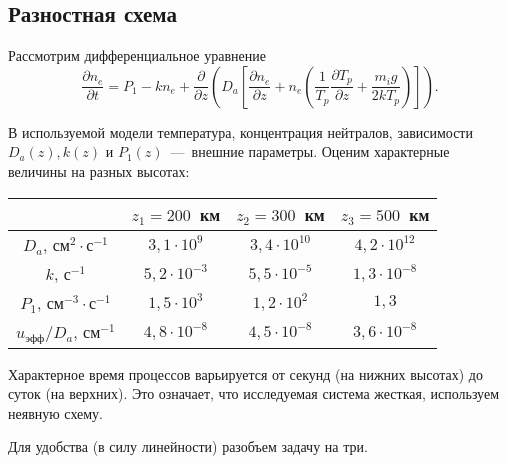 \documentclass[14pt, a4paper, fleqn, twoside]{extreport}
\theoremstyle{definiton}
\theoremstyle{definition}
\begin{document}
\subsection*{Разностная схема}

Рассмотрим дифференциальное уравнение $$\dfrac{\partial n_e}{\partial t}=P_1-kn_e + \dfrac{\partial}{\partial z}\left(D_a\left[\dfrac{\partial n_e}{\partial z}+n_e\left(\dfrac{1}{T_p}\dfrac{\partial T_p}{\partial z}+\dfrac{m_ig}{2kT_p}\right)\right]\right).$$

В используемой модели температура, концентрация нейтралов, зависимости $D_a(z), k(z)$ и $P_1(z)$~---~внешние параметры. Оценим характерные величины на разных высотах:

\smallskip

\begin{tabular}{|c|c|c|c|}
\hline
&$z_1=200$~км&$z_2=300$~км&$z_3=500$~км\\
\hline
$D_a$, см$^{2}\cdot$с$^{-1}$&$3{,}1\cdot 10^9$&$3{,}4\cdot 10^{10}$&$4{,}2\cdot 10^{12}$\\
\hline
$k$, с$^{-1}$&$5{,}2\cdot 10^{-3}$&$5{,}5\cdot 10^{-5}$&$1{,}3\cdot 10^{-8}$\\
\hline
$P_1$, см$^{-3}\cdot$с$^{-1}$&$1{,}5\cdot 10^3$&$1{,}2\cdot 10^{2}$&$1{,}3$\\
\hline
$u_\textrm{эфф}/D_a$, см$^{-1}$&$4{,}8\cdot 10^{-8}$&$4{,}5\cdot 10^{-8}$&$3{,}6\cdot 10^{-8}$\\
\hline
\end{tabular}

\medskip

Характерное время процессов варьируется от секунд (на нижних высотах) до суток (на верхних). Это означает, что исследуемая система жесткая, используем неявную схему.

\medskip

Для удобства (в силу линейности) разобъем задачу на три.
\end{document}
